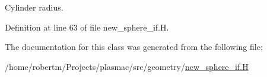 Cylinder radius. 



Definition at line 63 of file new\+\_\+sphere\+\_\+if.\+H.



The documentation for this class was generated from the following file\+:\begin{DoxyCompactItemize}
\item 
/home/robertm/\+Projects/plasmac/src/geometry/\hyperlink{new__sphere__if_8H}{new\+\_\+sphere\+\_\+if.\+H}\end{DoxyCompactItemize}
